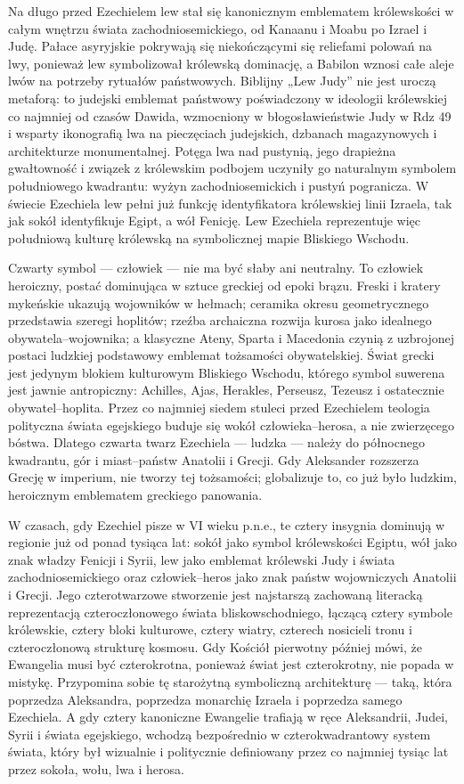Na długo przed Ezechielem lew stał się kanonicznym emblematem królewskości w całym wnętrzu świata zachodniosemickiego, od Kanaanu i Moabu po Izrael i Judę.
Pałace asyryjskie pokrywają się niekończącymi się reliefami polowań na lwy, ponieważ lew symbolizował królewską dominację, a Babilon wznosi całe aleje lwów na potrzeby rytuałów państwowych.
Biblijny „Lew Judy” nie jest uroczą metaforą: to judejski emblemat państwowy poświadczony w ideologii królewskiej co najmniej od czasów Dawida, wzmocniony w błogosławieństwie Judy w Rdz 49 i wsparty ikonografią lwa na pieczęciach judejskich, dzbanach magazynowych i architekturze monumentalnej.
Potęga lwa nad pustynią, jego drapieżna gwałtowność i związek z królewskim podbojem uczyniły go naturalnym symbolem południowego kwadrantu: wyżyn zachodniosemickich i pustyń pogranicza.
W świecie Ezechiela lew pełni już funkcję identyfikatora królewskiej linii Izraela, tak jak sokół identyfikuje Egipt, a wół Fenicję.
Lew Ezechiela reprezentuje więc południową kulturę królewską na symbolicznej mapie Bliskiego Wschodu.

Czwarty symbol — człowiek — nie ma być słaby ani neutralny.
To człowiek heroiczny, postać dominująca w sztuce greckiej od epoki brązu.
Freski i kratery mykeńskie ukazują wojowników w hełmach; ceramika okresu geometrycznego przedstawia szeregi hoplitów; rzeźba archaiczna rozwija kurosa jako idealnego obywatela–wojownika; a klasyczne Ateny, Sparta i Macedonia czynią z uzbrojonej postaci ludzkiej podstawowy emblemat tożsamości obywatelskiej.
Świat grecki jest jedynym blokiem kulturowym Bliskiego Wschodu, którego symbol suwerena jest jawnie antropiczny: Achilles, Ajas, Herakles, Perseusz, Tezeusz i ostatecznie obywatel–hoplita.
Przez co najmniej siedem stuleci przed Ezechielem teologia polityczna świata egejskiego buduje się wokół człowieka–herosa, a nie zwierzęcego bóstwa.
Dlatego czwarta twarz Ezechiela — ludzka — należy do północnego kwadrantu, gór i miast–państw Anatolii i Grecji.
Gdy Aleksander rozszerza Grecję w imperium, nie tworzy tej tożsamości; globalizuje to, co już było ludzkim, heroicznym emblematem greckiego panowania.

W czasach, gdy Ezechiel pisze w VI wieku p.n.e., te cztery insygnia dominują w regionie już od ponad tysiąca lat: sokół jako symbol królewskości Egiptu, wół jako znak władzy Fenicji i Syrii, lew jako emblemat królewski Judy i świata zachodniosemickiego oraz człowiek–heros jako znak państw wojowniczych Anatolii i Grecji.
Jego czterotwarzowe stworzenie jest najstarszą zachowaną literacką reprezentacją czteroczłonowego świata bliskowschodniego, łączącą cztery symbole królewskie, cztery bloki kulturowe, cztery wiatry, czterech nosicieli tronu i czteroczłonową strukturę kosmosu.
Gdy Kościół pierwotny później mówi, że Ewangelia musi być czterokrotna, ponieważ świat jest czterokrotny, nie popada w mistykę.
Przypomina sobie tę starożytną symboliczną architekturę — taką, która poprzedza Aleksandra, poprzedza monarchię Izraela i poprzedza samego Ezechiela.
A gdy cztery kanoniczne Ewangelie trafiają w ręce Aleksandrii, Judei, Syrii i świata egejskiego, wchodzą bezpośrednio w czterokwadrantowy system świata, który był wizualnie i politycznie definiowany przez co najmniej tysiąc lat przez sokoła, wołu, lwa i herosa.

